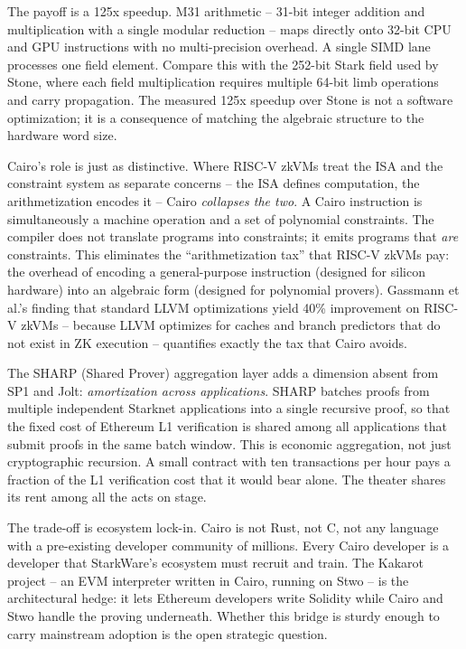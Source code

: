 \documentclass[
  11pt,
  openany]{report}
\begin{document}
The payoff is a 125x speedup. M31 arithmetic -- 31-bit integer addition and
multiplication with a single modular reduction -- maps directly onto 32-bit CPU
and GPU instructions with no multi-precision overhead. A single SIMD lane
processes one field element. Compare this with the 252-bit Stark field used by
Stone, where each field multiplication requires multiple 64-bit limb operations
and carry propagation. The measured 125x speedup over Stone is not a software
optimization; it is a consequence of matching the algebraic structure to the
hardware word size.

Cairo's role is just as distinctive. Where RISC-V zkVMs treat the ISA and the
constraint system as separate concerns -- the ISA defines computation, the
arithmetization encodes it -- Cairo \emph{collapses the two}. A Cairo
instruction is simultaneously a machine operation and a set of polynomial
constraints. The compiler does not translate programs into constraints; it emits
programs that \emph{are} constraints. This eliminates the ``arithmetization
tax'' that RISC-V zkVMs pay: the overhead of encoding a general-purpose
instruction (designed for silicon hardware) into an algebraic form (designed for
polynomial provers). Gassmann et al.'s finding that standard LLVM optimizations
yield 40\% improvement on RISC-V zkVMs -- because LLVM optimizes for caches and
branch predictors that do not exist in ZK execution -- quantifies exactly the
tax that Cairo avoids.

The SHARP (Shared Prover) aggregation layer adds a dimension absent from SP1 and
Jolt: \emph{amortization across applications}. SHARP batches proofs from
multiple independent Starknet applications into a single recursive proof, so
that the fixed cost of Ethereum L1 verification is shared among all applications
that submit proofs in the same batch window. This is economic aggregation, not
just cryptographic recursion. A small contract with ten transactions per hour
pays a fraction of the L1 verification cost that it would bear alone. The
theater shares its rent among all the acts on stage.

The trade-off is ecosystem lock-in. Cairo is not Rust, not C, not any language
with a pre-existing developer community of millions. Every Cairo developer is a
developer that StarkWare's ecosystem must recruit and train. The Kakarot project
-- an EVM interpreter written in Cairo, running on Stwo -- is the architectural
hedge: it lets Ethereum developers write Solidity while Cairo and Stwo handle
the proving underneath. Whether this bridge is sturdy enough to carry mainstream
adoption is the open strategic question.
\end{document}
